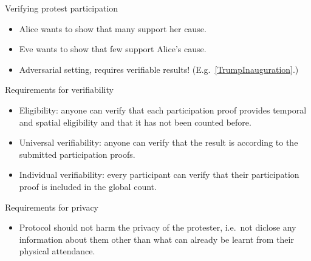 \begin{columns}[t]

  \begin{column}{0.32\linewidth}

    \begin{redblock}{Verifying protest participation}
      \begin{itemize}
        \item Alice wants to show that many support her cause.
        \item Eve wants to show that few support Alice's cause.
        \item {\color{red} Adversarial setting, requires verifiable results!}
          (E.g.\ \cref{TrumpInauguration}.)
      \end{itemize}
    \end{redblock}

    \begin{blueblock}{Requirements for verifiability}
      \begin{itemize}
        \item\label{EligibilityVerif} Eligibility: anyone can verify that each 
          participation proof provides temporal and spatial eligibility and that 
          it has not been counted before.

        \item\label{UniversalVerif} Universal verifiability: anyone can verify 
          that the result is according to the submitted participation proofs.

        \item\label{IndividualVerif} Individual verifiability: every participant 
          can verify that their participation proof is included in the global 
          count.
      \end{itemize}
    \end{blueblock}

    \begin{blueblock}{Requirements for privacy}
      \begin{itemize}
        \item Protocol should not harm the privacy of the protester, i.e.\  not 
          diclose any information about them other than what can already be 
          learnt from their physical attendance.
      \end{itemize}
    \end{blueblock}

  \end{column}


\end{columns}
